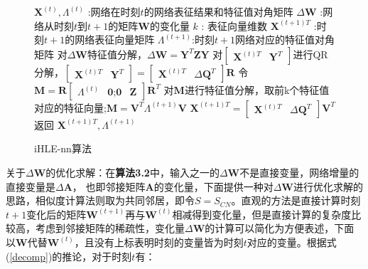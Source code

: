 \begin{figure}[htb]
	\centering
	\begin{minipage}{.7\linewidth}
		\begin{algorithm}[H]\label{iHLE_nn}
			\small
			\caption{iHLE-nn算法}
			\begin{algorithmic}[1]
				\Require
				\Statex $\textbf{X} ^{(t)},\Lambda^{(t)}$ :网络在时刻$t$的网络表征结果和特征值对角矩阵
				\Statex $\Delta\textbf{W}$ :网络从时刻$t$到$t+1$的矩阵$\textbf{W}$的变化量
				\Statex $k$ : 表征向量维数
				\Ensure
				\Statex $\textbf{X}^{(t+1)T}$ :时刻$t+1$的网络表征向量矩阵
				\Statex $\Lambda^{(t+1)}$:时刻$t+1$网络对应的特征值对角矩阵
				\Statex
				\State 对$\Delta\textbf{W}$特征值分解，$\Delta\textbf{W} =  \textbf{Y}^{T} \textbf{Z}  \textbf{Y}$
				\State 对$\begin{bmatrix} \textbf{X}^{(t)T} & \textbf{Y}^{T}\end{bmatrix}$进行QR分解，$\begin{bmatrix} \textbf{X}^{(t)T} & \textbf{Y}^{T}\end{bmatrix} = \begin{bmatrix} \textbf{X}^{(t)T} & \Delta\textbf{Q}^{T} \end{bmatrix} \textbf{R}$
				\State 令$\textbf{M} = \textbf{R}\begin{bmatrix}  \Lambda^{(t)} & \textbf{0};
				\textbf{0} & \textbf{Z} \end{bmatrix}
				\textbf{R}^T$
				\State 对$\textbf{M}$进行特征值分解，取前k个特征值对应的特征向量;$\textbf{M} =\textbf{V}^T \Lambda^{(t+1)} \textbf{V}$
				\State $\textbf{X}^{(t+1)T} = \begin{bmatrix} \textbf{X}^{(t)T} & \Delta\textbf{Q}^{T} \end{bmatrix} \textbf{V}^T$
				\State 返回 $\textbf{X}^{(t+1)T}, \Lambda^{(t+1)}$
			\end{algorithmic}
		\end{algorithm}
	\end{minipage}
\end{figure}


\remark 关于$\Delta\textbf{W}$的优化求解：在\textbf{算法3.2}中，输入之一的$\Delta\textbf{W}$不是直接变量，网络增量的直接变量是$\Delta\textbf{A}$， 也即邻接矩阵$\textbf{A}$的变化量，下面提供一种对$\Delta\textbf{W}$进行优化求解的思路，相似度计算法则取为共同邻居，即令$S=S_{CN}$。直观的方法是直接计算时刻$t+1$变化后的矩阵$\textbf{W}^{(t+1)}$再与$\textbf{W}^{(t)}$相减得到变化量，但是直接计算的复杂度比较高，考虑到邻接矩阵的稀疏性，变化量$\Delta\textbf{W}$的计算可以简化为方便表述，下面以$\textbf{W}$代替$\textbf{W}^{(t)}$，且没有上标表明时刻的变量皆为时刻$t$对应的变量。根据式(\ref{decomp})的推论，对于时刻$t$有：

